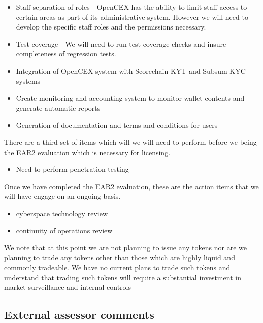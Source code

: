 \documentclass[]{report}
\begin{document}
\begin{itemize}

\item Staff separation of roles - OpenCEX has the ability to limit
  staff access to certain areas as part of its administrative system.
  However we will need to develop the specific staff roles and the
  permissions necessary.

\item Test coverage - We will need to run test coverage checks and
  insure completeness of regression tests.

\item Integration of OpenCEX system with Scorechain KYT and Subsum KYC
  systems

\item Create monitoring and accounting system to monitor wallet
  contents and generate automatic reports

\item Generation of documentation and terms and conditions for users

\end{itemize}

There are a third set of items which will we will need to perform
before we being the EAR2 evaluation which is necessary for licensing.

\begin{itemize}
\item Need to perform penetration testing
\end{itemize}

Once we have completed the EAR2 evaluation, these are the action items
that we will have engage on an ongoing basis.

\begin{itemize}
\item cyberspace technology review
\item continuity of operations review
\end{itemize}

We note that at this point we are not planning to issue any tokens nor
are we planning to trade any tokens other than those which are highly
liquid and commonly tradeable.  We have no current plans to trade such
tokens and understand that trading such tokens will require a
substantial investment in market surveillance and internal controls

\subsection{External assessor comments}
\end{document}
